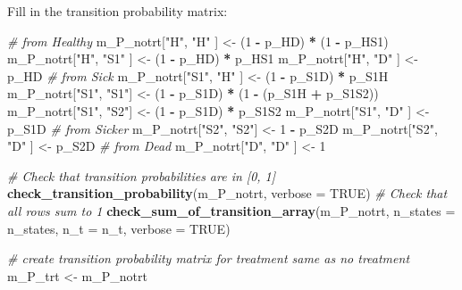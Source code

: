 \documentclass[]{article}
\newenvironment{Shaded}{\begin{snugshade}}{\end{snugshade}}
\newcommand{\KeywordTok}[1]{\textcolor[rgb]{0.13,0.29,0.53}{\textbf{#1}}}
\newcommand{\DataTypeTok}[1]{\textcolor[rgb]{0.13,0.29,0.53}{#1}}
\newcommand{\DecValTok}[1]{\textcolor[rgb]{0.00,0.00,0.81}{#1}}
\newcommand{\StringTok}[1]{\textcolor[rgb]{0.31,0.60,0.02}{#1}}
\newcommand{\CommentTok}[1]{\textcolor[rgb]{0.56,0.35,0.01}{\textit{#1}}}
\newcommand{\OtherTok}[1]{\textcolor[rgb]{0.56,0.35,0.01}{#1}}
\newcommand{\OperatorTok}[1]{\textcolor[rgb]{0.81,0.36,0.00}{\textbf{#1}}}
\newcommand{\NormalTok}[1]{#1}
\begin{document}
Fill in the transition probability matrix:

\begin{Shaded}
\begin{Highlighting}[]
\CommentTok{# from Healthy}
\NormalTok{m_P_notrt[}\StringTok{"H"}\NormalTok{, }\StringTok{"H"}\NormalTok{  ] <-}\StringTok{ }\NormalTok{(}\DecValTok{1} \OperatorTok{-}\StringTok{ }\NormalTok{p_HD) }\OperatorTok{*}\StringTok{ }\NormalTok{(}\DecValTok{1} \OperatorTok{-}\StringTok{ }\NormalTok{p_HS1)}
\NormalTok{m_P_notrt[}\StringTok{"H"}\NormalTok{, }\StringTok{"S1"}\NormalTok{ ] <-}\StringTok{ }\NormalTok{(}\DecValTok{1} \OperatorTok{-}\StringTok{ }\NormalTok{p_HD) }\OperatorTok{*}\StringTok{ }\NormalTok{p_HS1}
\NormalTok{m_P_notrt[}\StringTok{"H"}\NormalTok{, }\StringTok{"D"}\NormalTok{  ] <-}\StringTok{ }\NormalTok{p_HD}
\CommentTok{# from Sick}
\NormalTok{m_P_notrt[}\StringTok{"S1"}\NormalTok{, }\StringTok{"H"}\NormalTok{ ] <-}\StringTok{ }\NormalTok{(}\DecValTok{1} \OperatorTok{-}\StringTok{ }\NormalTok{p_S1D) }\OperatorTok{*}\StringTok{ }\NormalTok{p_S1H}
\NormalTok{m_P_notrt[}\StringTok{"S1"}\NormalTok{, }\StringTok{"S1"}\NormalTok{] <-}\StringTok{ }\NormalTok{(}\DecValTok{1} \OperatorTok{-}\StringTok{ }\NormalTok{p_S1D) }\OperatorTok{*}\StringTok{ }\NormalTok{(}\DecValTok{1} \OperatorTok{-}\StringTok{ }\NormalTok{(p_S1H }\OperatorTok{+}\StringTok{ }\NormalTok{p_S1S2))}
\NormalTok{m_P_notrt[}\StringTok{"S1"}\NormalTok{, }\StringTok{"S2"}\NormalTok{] <-}\StringTok{ }\NormalTok{(}\DecValTok{1} \OperatorTok{-}\StringTok{ }\NormalTok{p_S1D) }\OperatorTok{*}\StringTok{ }\NormalTok{p_S1S2}
\NormalTok{m_P_notrt[}\StringTok{"S1"}\NormalTok{, }\StringTok{"D"}\NormalTok{ ] <-}\StringTok{ }\NormalTok{p_S1D}
\CommentTok{# from Sicker}
\NormalTok{m_P_notrt[}\StringTok{"S2"}\NormalTok{, }\StringTok{"S2"}\NormalTok{] <-}\StringTok{ }\DecValTok{1} \OperatorTok{-}\StringTok{ }\NormalTok{p_S2D}
\NormalTok{m_P_notrt[}\StringTok{"S2"}\NormalTok{, }\StringTok{"D"}\NormalTok{ ] <-}\StringTok{ }\NormalTok{p_S2D}
\CommentTok{# from Dead}
\NormalTok{m_P_notrt[}\StringTok{"D"}\NormalTok{, }\StringTok{"D"}\NormalTok{  ] <-}\StringTok{ }\DecValTok{1}

\CommentTok{# Check that transition probabilities are in [0, 1]}
\KeywordTok{check_transition_probability}\NormalTok{(m_P_notrt, }\DataTypeTok{verbose =} \OtherTok{TRUE}\NormalTok{)}
\CommentTok{# Check that all rows sum to 1}
\KeywordTok{check_sum_of_transition_array}\NormalTok{(m_P_notrt, }\DataTypeTok{n_states =}\NormalTok{ n_states, }\DataTypeTok{n_t =}\NormalTok{ n_t, }\DataTypeTok{verbose =} \OtherTok{TRUE}\NormalTok{)}

\CommentTok{# create transition probability matrix for treatment same as no treatment}
\NormalTok{m_P_trt <-}\StringTok{ }\NormalTok{m_P_notrt}
\end{Highlighting}
\end{Shaded}
\end{document}
